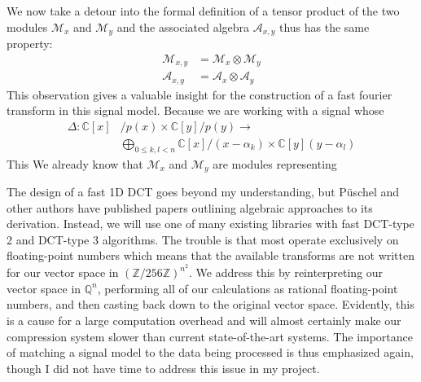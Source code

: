 \documentclass[12pt,technote]{IEEEtran}
\begin{document}
We now take a detour into the formal definition of a tensor product of the two modules $\mathcal{M}_x$ and $\mathcal{M}_y$ and the associated algebra $\mathcal{A}_{x,y}$ thus has the same property:
\begin{align*}
    \mathcal{M}_{x,y} &= \mathcal{M}_x\otimes\mathcal{M}_y\\
    \mathcal{A}_{x,y} &= \mathcal{A}_x\otimes\mathcal{A}_y
\end{align*}
This observation gives a valuable insight for the construction of a fast fourier transform in this signal model. Because we are working with a signal whose
\begin{align*}
    \Delta : \mathbb{C}[x]&/p(x)\times\mathbb{C}[y]/p(y)\to\\
    &\bigoplus_{0\leq k,l<n}\mathbb{C}[x]/(x - \alpha_k)\times \mathbb{C}[y](y - \alpha_{l})
\end{align*}
This We already know that $\mathcal{M}_x$ and $\mathcal{M}_y$ are modules representing

The design of a fast 1D DCT goes beyond my understanding, but P\"uschel and other authors have published papers outlining algebraic approaches to its derivation\cite{puschel2003cooley,fastdct1988}. Instead, we will use one of many existing libraries with fast DCT-type 2 and DCT-type 3 algorithms. The trouble is that most operate exclusively on floating-point numbers which means that the available transforms are not written for our vector space in $(\mathbb{Z}/256\mathbb{Z})^{n^2}$. We address this by reinterpreting our vector space in $\mathbb{Q}^n$, performing all of our calculations as rational floating-point numbers, and then casting back down to the original vector space. Evidently, this is a cause for a large computation overhead and will almost certainly make our compression system slower than current state-of-the-art systems. The importance of matching a signal model to the data being processed is thus emphasized again, though I did not have time to address this issue in my project.
\end{document}
